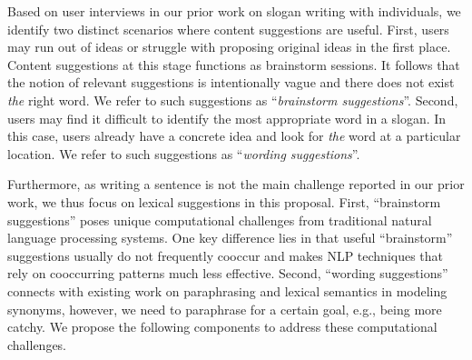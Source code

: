 Based on user interviews in our prior work on slogan writing with individuals, we identify two distinct scenarios where content suggestions are useful.
First, users may run out of ideas or struggle with proposing original ideas in the first place.
Content suggestions at this stage functions as brainstorm sessions.
It follows that the notion of relevant suggestions is intentionally vague and there does not exist {\em the} right word.
We refer to such suggestions as ``{\em brainstorm suggestions}''.
Second, users may find it difficult to identify the most appropriate word in a slogan.
In this case, users already have a concrete idea and look for {\em the} word at a particular location.
We refer to such suggestions as ``{\em wording suggestions}''.

Furthermore, as writing a sentence is not the main challenge reported in our prior work, we thus focus on lexical suggestions in this proposal.
First, ``brainstorm suggestions'' poses unique computational challenges from traditional natural language processing systems.
One key difference lies in that useful ``brainstorm'' suggestions usually do not frequently cooccur and makes NLP techniques that rely on cooccurring patterns much less effective.
Second, ``wording suggestions'' connects with existing work on paraphrasing and lexical semantics in modeling synonyms, however, we need to paraphrase for a certain goal, e.g., being more catchy.
We propose the following 
components to address these computational challenges.

